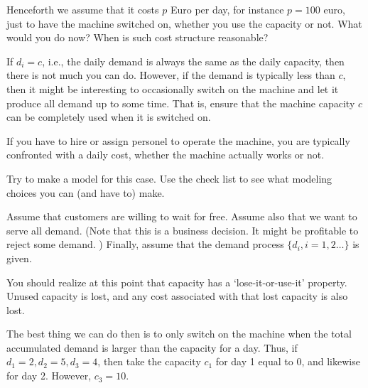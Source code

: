 \begin{question}
  Henceforth we assume that it costs $p$ Euro per day, for instance
  $p=100$ euro, just to have the machine switched on, whether you use
  the capacity or not. What would you do now? When is such cost structure reasonable?
  \begin{solution}
    If $d_i=c$, i.e., the daily demand is always the same as the daily
    capacity, then there is not much you can do. However, if the
    demand is typically less than $c$, then it might be interesting to
    occasionally switch on the machine and let it produce all demand
    up to some time. That is, ensure that the machine capacity $c$ can
    be completely used when it is switched on. 

    If you have to hire or assign personel to operate the machine, you
    are typically confronted with a daily cost, whether the machine
    actually works or not.
  \end{solution}
\end{question}



\begin{question}
  Try to make a model for this case.  Use the check list to see what
  modeling choices you can (and have to) make.
  \begin{solution}
    Assume that customers are willing to wait for free.  Assume also
    that we want to serve all demand. (Note that this is a business
    decision. It might be profitable to reject some demand. ) Finally,
    assume that the demand process $\{d_i, i=1,2\ldots\}$ is given.

    You should realize at this point that capacity has a
    `lose-it-or-use-it' property. Unused capacity is lost, and any
    cost associated with that lost capacity is also lost.

    The best thing we can do then is to only switch on the machine
    when the total accumulated demand is larger than the capacity for
    a day.  Thus, if $d_1=2, d_2 = 5, d_3 = 4$, then take the capacity
    $c_1$ for day 1 equal to 0, and likewise for day 2. However,
    $c_3 =10$. 
  \end{solution}
\end{question}


